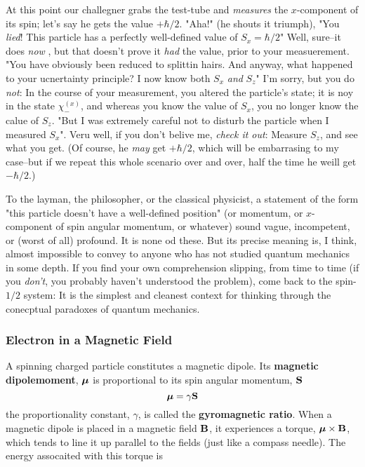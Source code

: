 At this point our challegner grabs the test-tube and \textit{measures} the $x$-component of its spin; let's say he gets the value $+\hbar/2$. "Aha!" (he shouts it triumph), "You \textit{lied}! This particle has a perfectly well-defined value of $S_x=\hbar/2$" Well, sure--it does \textit{now} , but that doesn't prove it \textit{had} the value, prior to your measuerement. "You have obviously been reduced to splittin hairs. And anyway, what happened to your ucnertainty principle? I now know both $S_x$ \textit{and} $S_z$" I'm sorry, but you do \textit{not}: In the course of your measurement, you altered the particle's state; it is noy in the state $\chi_-^{(x)}$, and whereas you know the value of $S_x$, you no longer know the calue of $S_z$. "But I was extremely careful not to disturb the particle when I measured $S_x$". Veru well, if you don't belive me, \textit{check it out}: Measure $S_z$,  and see what you get. (Of course, he \textit{may} get $+\hbar/2$, which will be embarrasing to my case--but if we repeat this whole scenario over and over, half the time he weill get $-\hbar/2$.)

To the layman, the philosopher, or the classical physicist, a statement of the form "this particle doesn't have a well-defined position" (or momentum, or $x$-component of spin angular momentum, or whatever) sound vague, incompetent, or (worst of all) profound. It is none od these. But its precise meaning is, I think, almost impossible to convey to anyone who has not studied quantum mechanics in some depth. If you find your own comprehension slipping, from time to time (if you \textit{don't}, you probably haven't understood the problem), come back to the spin-$1/2$ system: It is the simplest and cleanest context for thinking through the conecptual paradoxes of quantum mechanics.

\subsubsection{Electron in a Magnetic Field}\label{sec:4.4.2}
A spinning charged particle constitutes a magnetic dipole. Its \textbf{magnetic dipolemoment}, $\vb*{\mu}$ is proportional to its spin angular momentum, $\vb{S}$
\begin{equation}\label{4.156}
	\vb*{\mu}=\gamma\vb{S}
\end{equation}
the proportionality constant, $\gamma$, is called the \textbf{gyromagnetic ratio}. When a magnetic dipole is placed in a magnetic field $\vb{B}$, it experiences a torque, $\vb*{\mu}\times\vb{B}$, which tends to line it up parallel to the fields (just like a compass needle). The energy assocaited with this torque is

